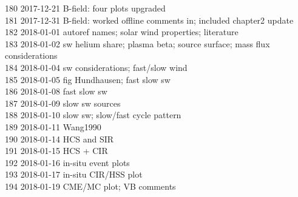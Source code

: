 \begin{footnotesize}
180	2017-12-21	B-field: four plots upgraded\\
181	2017-12-31	B-field: worked offline comments in; included chapter2 update\\
182	2018-01-01	autoref names; solar wind properties; literature\\
183	2018-01-02	sw helium share; plasma beta; source surface; mass flux considerations\\
184	2018-01-04	sw considerations; fast/slow wind\\
185	2018-01-05	fig Hundhausen; fast slow sw\\
186	2018-01-08	fast slow sw\\
187	2018-01-09	slow sw sources\\
188	2018-01-10	slow sw; slow/fast cycle pattern\\
189	2018-01-11	Wang1990\\
190	2018-01-14	HCS and SIR\\
191	2018-01-15	HCS + CIR\\
192	2018-01-16	in-situ event plots\\
193	2018-01-17	in-situ CIR/HSS plot\\
194	2018-01-19	CME/MC plot; VB comments\\

\end{footnotesize}
